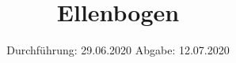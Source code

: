 

\subject{TPS Praktikum}
\title{Ellenbogen}
\date{%
	Durchführung: 29.06.2020
	\hspace{3em}
	Abgabe: 12.07.2020
}


	
	\maketitle
	\thispagestyle{empty}
	\tableofcontents
	\newpage
	\setlength{\parindent}{0em}
	
	
	
	\newpage
	\printbibliography{}
	\nocite{*}
	
	

